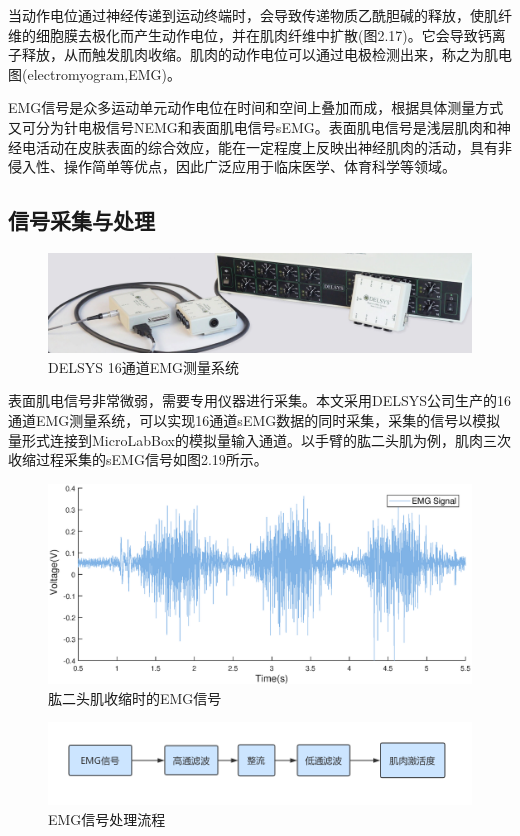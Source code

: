 当动作电位通过神经传递到运动终端时，会导致传递物质乙酰胆碱的释放，使肌纤维的细胞膜去极化而产生动作电位，并在肌肉纤维中扩散(图2.17)。它会导致钙离子释放，从而触发肌肉收缩。肌肉的动作电位可以通过电极检测出来，称之为肌电图(electromyogram,EMG)。

EMG信号是众多运动单元动作电位在时间和空间上叠加而成，根据具体测量方式又可分为针电极信号NEMG和表面肌电信号sEMG。表面肌电信号是浅层肌肉和神经电活动在皮肤表面的综合效应，能在一定程度上反映出神经肌肉的活动，具有非侵入性、操作简单等优点，因此广泛应用于临床医学、体育科学等领域。

\subsection{信号采集与处理}

\begin{figure}[htb]
    \includegraphics[width=16cm]{fig/f44.jpg}
    \caption{DELSYS 16通道EMG测量系统}
    \label{fig:mark}
\end{figure}

表面肌电信号非常微弱，需要专用仪器进行采集。本文采用DELSYS公司生产的16通道EMG测量系统，可以实现16通道sEMG数据的同时采集，采集的信号以模拟量形式连接到MicroLabBox的模拟量输入通道。以手臂的肱二头肌为例，肌肉三次收缩过程采集的sEMG信号如图2.19所示。

\begin{figure}[htb]
    \includegraphics[width=17cm]{fig/f45.eps}
    \caption{肱二头肌收缩时的EMG信号}
    \label{fig:mark}
\end{figure}

\begin{figure}[htb]
    \includegraphics[width=16cm]{fig/f47.png}
    \caption{EMG信号处理流程}
    \label{fig:mark}
\end{figure}

